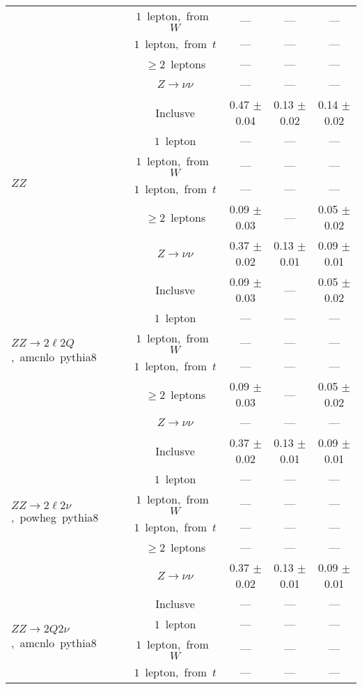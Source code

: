 \documentclass{article}
\begin{document}
\begin{longtable}{|l|c|c|c|c|}
 & $1$~lepton,~from~$W$  & ---  & ---  & --- \\* 
 & $1$~lepton,~from~$t$  & ---  & ---  & --- \\* 
 & $\ge2$~leptons  & ---  & ---  & --- \\* 
 & $Z\rightarrow\nu\nu$  & ---  & ---  & --- \\* 
\hline 
\multirow{6}{*}{$ZZ$} & Inclusve  & 0.47 $\pm$ 0.04  & 0.13 $\pm$ 0.02  & 0.14 $\pm$ 0.02 \\* 
 & $1$~lepton  & ---  & ---  & --- \\* 
 & $1$~lepton,~from~$W$  & ---  & ---  & --- \\* 
 & $1$~lepton,~from~$t$  & ---  & ---  & --- \\* 
 & $\ge2$~leptons  & 0.09 $\pm$ 0.03  & ---  & 0.05 $\pm$ 0.02 \\* 
 & $Z\rightarrow\nu\nu$  & 0.37 $\pm$ 0.02  & 0.13 $\pm$ 0.01  & 0.09 $\pm$ 0.01 \\* 
\hline 
\multirow{6}{*}{$ZZ{\rightarrow}2{\ell}2Q$,~amcnlo~pythia8} & Inclusve  & 0.09 $\pm$ 0.03  & ---  & 0.05 $\pm$ 0.02 \\* 
 & $1$~lepton  & ---  & ---  & --- \\* 
 & $1$~lepton,~from~$W$  & ---  & ---  & --- \\* 
 & $1$~lepton,~from~$t$  & ---  & ---  & --- \\* 
 & $\ge2$~leptons  & 0.09 $\pm$ 0.03  & ---  & 0.05 $\pm$ 0.02 \\* 
 & $Z\rightarrow\nu\nu$  & ---  & ---  & --- \\* 
\hline 
\multirow{6}{*}{$ZZ{\rightarrow}2{\ell}2{\nu}$,~powheg~pythia8} & Inclusve  & 0.37 $\pm$ 0.02  & 0.13 $\pm$ 0.01  & 0.09 $\pm$ 0.01 \\* 
 & $1$~lepton  & ---  & ---  & --- \\* 
 & $1$~lepton,~from~$W$  & ---  & ---  & --- \\* 
 & $1$~lepton,~from~$t$  & ---  & ---  & --- \\* 
 & $\ge2$~leptons  & ---  & ---  & --- \\* 
 & $Z\rightarrow\nu\nu$  & 0.37 $\pm$ 0.02  & 0.13 $\pm$ 0.01  & 0.09 $\pm$ 0.01 \\* 
\hline 
\multirow{6}{*}{$ZZ{\rightarrow}2Q2{\nu}$,~amcnlo~pythia8} & Inclusve  & ---  & ---  & --- \\* 
 & $1$~lepton  & ---  & ---  & --- \\* 
 & $1$~lepton,~from~$W$  & ---  & ---  & --- \\* 
 & $1$~lepton,~from~$t$  & ---  & ---  & --- \\* 

\end{longtable}
\end{document}
